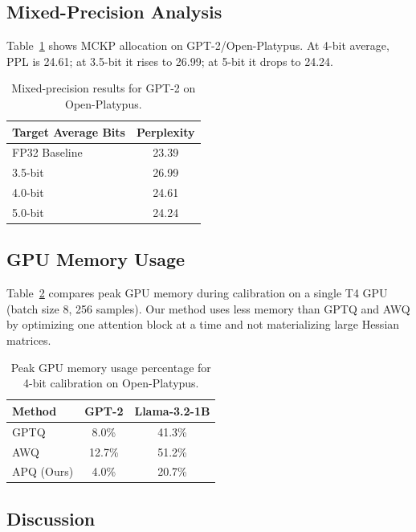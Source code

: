 \documentclass[10pt,twocolumn,letterpaper]{article}
\begin{document}
\subsection{Mixed-Precision Analysis}

Table~\ref{tab:mixed} shows MCKP allocation on GPT-2/Open-Platypus. At 4-bit average, PPL is 24.61; at 3.5-bit it rises to 26.99; at 5-bit it drops to 24.24.

\begin{table}[H]
\centering
\caption{Mixed-precision results for GPT-2 on Open-Platypus.}
\label{tab:mixed}
\small
\begin{tabular}{lc}
\toprule
Target Average Bits & Perplexity \\
\midrule
FP32 Baseline & 23.39 \\
3.5-bit & 26.99 \\
4.0-bit & 24.61 \\
5.0-bit & 24.24 \\
\bottomrule
\end{tabular}
\end{table}

\subsection{GPU Memory Usage}

Table~\ref{tab:memory} compares peak GPU memory during calibration on a single T4 GPU (batch size 8, 256 samples). Our method uses less memory than GPTQ and AWQ by optimizing one attention block at a time and not materializing large Hessian matrices.

\begin{table}[h]
\centering
\caption{Peak GPU memory usage percentage for 4-bit calibration on Open-Platypus.}
\label{tab:memory}
\small
\begin{tabular}{lcc}
\toprule
Method & GPT-2 & Llama-3.2-1B \\
\midrule
GPTQ~\cite{gptq} & 8.0\% & 41.3\% \\
AWQ~\cite{lin2024awq} & 12.7\% & 51.2\% \\
APQ (Ours) & 4.0\% & 20.7\% \\
\bottomrule
\end{tabular}
\end{table}

\subsection{Discussion}
\end{document}
